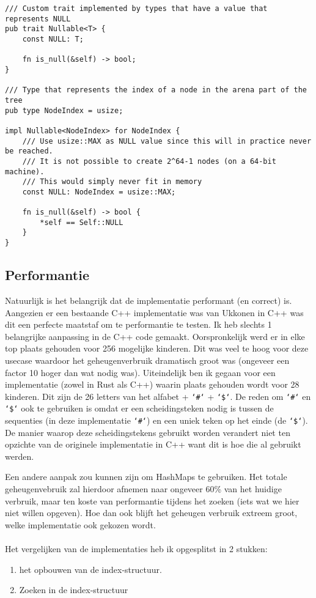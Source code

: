 \begin{verbatim}
/// Custom trait implemented by types that have a value that represents NULL
pub trait Nullable<T> {
    const NULL: T;

    fn is_null(&self) -> bool;
}

/// Type that represents the index of a node in the arena part of the tree
pub type NodeIndex = usize;

impl Nullable<NodeIndex> for NodeIndex {
    /// Use usize::MAX as NULL value since this will in practice never be reached.
    /// It is not possible to create 2^64-1 nodes (on a 64-bit machine).
    /// This would simply never fit in memory
    const NULL: NodeIndex = usize::MAX;

    fn is_null(&self) -> bool {
        *self == Self::NULL
    }
}
\end{verbatim}

\subsection{Performantie}\label{subsec:performantie}
Natuurlijk is het belangrijk dat de implementatie performant (en correct) is.
Aangezien er een bestaande C++ implementatie was van Ukkonen in C++ was dit een perfecte maatstaf om te performantie te testen.
Ik heb slechts 1 belangrijke aanpassing in de C++ code gemaakt.
Oorspronkelijk werd er in elke top plaats gehouden voor 256 mogelijke kinderen.
Dit was veel te hoog voor deze usecase waardoor het geheugenverbruik dramatisch groot was (ongeveer een factor 10 hoger dan wat nodig was).
Uiteindelijk ben ik gegaan voor een implementatie (zowel in Rust als C++) waarin plaats gehouden wordt voor 28 kinderen.
Dit zijn de 26 letters van het alfabet + \texttt{`\#`} + \texttt{`\$`}.
De reden om \texttt{`\#`} en \texttt{`\$`} ook te gebruiken is omdat er een scheidingsteken nodig is tussen de sequenties (in deze implementatie \texttt{`\#`}) en een uniek teken op het einde (de \texttt{`\$`}).
De manier waarop deze scheidingstekens gebruikt worden verandert niet ten opzichte van de originele implementatie in C++ want dit is hoe die al gebruikt werden.

Een andere aanpak zou kunnen zijn om HashMaps te gebruiken.
Het totale geheugenvebruik zal hierdoor afnemen naar ongeveer 60\% van het huidige verbruik, maar ten koste van performantie tijdens het zoeken (iets wat we hier niet willen opgeven).
Hoe dan ook blijft het geheugen verbruik extreem groot, welke implementatie ook gekozen wordt.
\\ \\
Het vergelijken van de implementaties heb ik opgesplitst in 2 stukken:
\begin{enumerate}
    \item het opbouwen van de index-structuur.
    \item Zoeken in de index-structuur
\end{enumerate}

